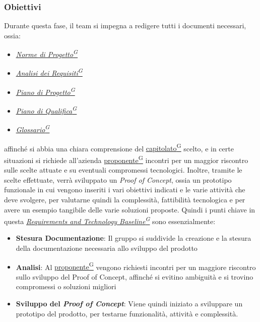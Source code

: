 \documentclass[a4paper,12pt]{article}
\providecommand{\glslink}[2]{\href{https://alittlebyte-19.github.io/Documentazione/glossario.html\#gls-#1}{\underline{#2}\textsuperscript{\scriptsize G}}}
\begin{document}
\subsubsection{Obiettivi}
Durante questa fase, il team si impegna a redigere tutti i documenti necessari, ossia:
\begin{itemize}
    \item \textit{\glslink{norme-di-progetto}{Norme di Progetto}}
    \item \textit{\glslink{analisi-dei-requisiti-adr}{Analisi dei Requisiti}}
    \item \textit{\glslink{piano-di-progetto}{Piano di Progetto}}
    \item \textit{\glslink{piano-di-qualifica}{Piano di Qualifica}}
    \item \textit{\glslink{glossario}{Glossario}}
\end{itemize}
affinché si abbia una chiara comprensione del \glslink{capitolato}{capitolato} scelto, e in certe situazioni si richiede all'azienda \glslink{committente-proponente}{proponente} incontri per un maggior riscontro sulle scelte attuate e su
eventuali compromessi tecnologici. Inoltre, tramite le scelte effettuate, verrà sviluppato un \textit{Proof of Concept}, ossia un prototipo funzionale in cui vengono inseriti i vari obiettivi indicati e le 
varie attività che deve svolgere, per valutarne quindi la complessità, fattibilità tecnologica e per avere un esempio tangibile delle varie soluzioni proposte.
Quindi i punti chiave in questa \textit{\glslink{rtb-requirements-and-technology-baseline}{Requirements and Technology Baseline}} sono essenzialmente:
\begin{itemize}
    \item \textbf{Stesura Documentazione}: Il gruppo si suddivide la creazione e la stesura della documentazione necessaria allo sviluppo del prodotto
    \item \textbf{Analisi}: Al \glslink{committente-proponente}{proponente} vengono richiesti incontri per un maggiore riscontro sullo sviluppo del Proof of Concept, affinché si evitino ambiguità e si trovino compromessi o soluzioni migliori
    \item \textbf{Sviluppo del \textit{Proof of Concept}}: Viene quindi iniziato a sviluppare un prototipo del prodotto, per testarne funzionalità, attività e complessità.
\end{itemize}
\end{document}
